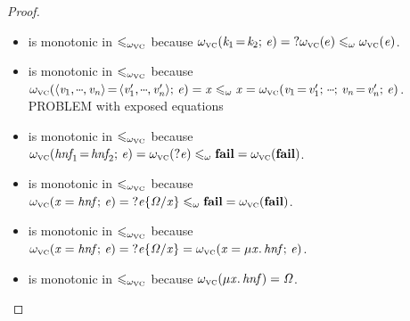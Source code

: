 \begin{proof}
\begin{itemize}
\item {} is monotonic in $\mathrel{\leqslant_{\omega_{\scriptscriptstyle\mathrm{VC}}}}$
because $\omega_{\scriptscriptstyle\mathrm{VC}}(\mathit{k}_{\mathrm{1}}\hspace{-0.14em}=\hspace{-0.14em}\mathit{k}_{\mathrm{2}};\,\mathit{e}) = {?}\omega_{\scriptscriptstyle\mathrm{VC}}(e) \mathrel{\leqslant_\omega} \omega_{\scriptscriptstyle\mathrm{VC}}(\mathit{e})$.

\item {} is monotonic in $\mathrel{\leqslant_{\omega_{\scriptscriptstyle\mathrm{VC}}}}$ \hfill\break
because $\omegavc(\ensuremath{\langle{}\Varid{v}_{\mathrm{1}},\mydots,\Varid{v}_{\Varid{n}}\rangle\hspace{-0.14em}=\hspace{-0.14em}\langle{}\Varid{v}_{1}',\mydots,\Varid{v}_{\Varid{n}}'\rangle;\,\Varid{e}}) = \ensuremath{\Varid{x}} \leqomega \ensuremath{\Varid{x}} = \omegavc(\ensuremath{\Varid{v}_{\mathrm{1}}\hspace{-0.14em}=\hspace{-0.14em}\Varid{v}_{1}';\,\mydots;\,\Varid{v}_{\Varid{n}}\hspace{-0.14em}=\hspace{-0.14em}\Varid{v}_{\Varid{n}}';\,\Varid{e}})$. {\color{red} PROBLEM with exposed equations}

\item {} is monotonic in $\mathrel{\leqslant_{\omega_{\scriptscriptstyle\mathrm{VC}}}}$
because $\omega_{\scriptscriptstyle\mathrm{VC}}(\mathit{hnf}_{\!1}\hspace{-0.14em}=\hspace{-0.14em}\mathit{hnf}_{\!2};\,\mathit{e}) = \omega_{\scriptscriptstyle\mathrm{VC}}(\mathbin{?}\mathit{e}) \mathrel{\leqslant_\omega} \textbf{fail} = \omega_{\scriptscriptstyle\mathrm{VC}}(\textbf{fail})$.

\item {} is monotonic in $\mathrel{\leqslant_{\omega_{\scriptscriptstyle\mathrm{VC}}}}$ \hfill\break
because $\omega_{\scriptscriptstyle\mathrm{VC}}(\mathit{x}\mathrel{=}\mathit{hnf};\,\mathit{e}) = {?}\mathit{e}\{\mathit{\Omega}/\mathit{x}\} \mathrel{\leqslant_\omega} \textbf{fail} = \omega_{\scriptscriptstyle\mathrm{VC}}(\textbf{fail})$.

\item {} is monotonic in $\mathrel{\leqslant_{\omega_{\scriptscriptstyle\mathrm{VC}}}}$ \hfill\break
because $\omega_{\scriptscriptstyle\mathrm{VC}}(\mathit{x}\mathrel{=}\mathit{hnf};\,\mathit{e}) = {?}\mathit{e}\{\mathit{\Omega}/\mathit{x}\} = \omega_{\scriptscriptstyle\mathrm{VC}}(\mathit{x}\mathrel{=}\mu\mathit{x}.\,\mathit{hnf};\,\mathit{e})$.

\item {} is monotonic in $\mathrel{\leqslant_{\omega_{\scriptscriptstyle\mathrm{VC}}}}$
because $\omega_{\scriptscriptstyle\mathrm{VC}}(\mu\mathit{x}.\,\mathit{hnf}) = \mathit{\Omega}$.


\end{itemize}
\end{proof}
